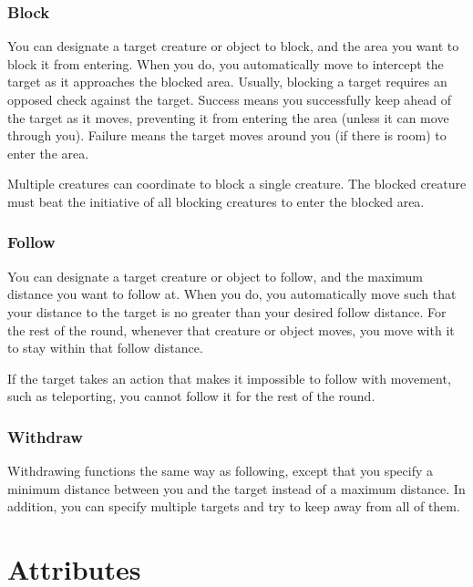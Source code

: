         \subsubsection{Block}\label{Block}
            You can designate a target creature or object to block, and the area you want to block it from entering.
            When you do, you automatically move to intercept the target as it approaches the blocked area.
            Usually, blocking a target requires an opposed  check against the target.
            Success means you successfully keep ahead of the target as it moves, preventing it from entering the area (unless it can move through you).
            Failure means the target moves around you (if there is room) to enter the area.

            Multiple creatures can coordinate to block a single creature.
            The blocked creature must beat the initiative of all blocking creatures to enter the blocked area.

        \subsubsection{Follow}\label{Follow}
            You can designate a target creature or object to follow, and the maximum distance you want to follow at. When you do, you automatically move such that your distance to the target is no greater than your desired follow distance. For the rest of the round, whenever that creature or object moves, you move with it to stay within that follow distance.

            If the target takes an action that makes it impossible to follow with movement, such as teleporting, you cannot follow it for the rest of the round.

        \subsubsection{Withdraw}\label{Withdraw}
            Withdrawing functions the same way as following, except that you specify a minimum distance between you and the target instead of a maximum distance.
            In addition, you can specify multiple targets and try to keep away from all of them.

    \section{Attributes}\label{Attributes}

